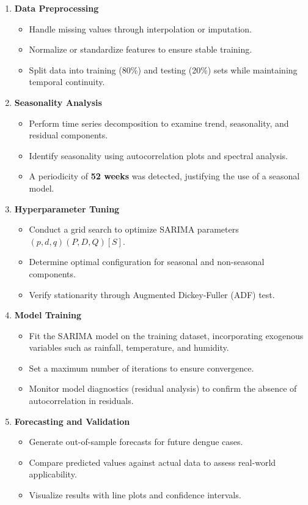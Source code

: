 \begin{enumerate}
	\item \textbf{Data Preprocessing}  
	\begin{itemize}
		\item Handle missing values through interpolation or imputation.
		\item Normalize or standardize features to ensure stable training.
		\item Split data into training (80\%) and testing (20\%) sets while maintaining temporal continuity.
	\end{itemize}
	
	\item \textbf{Seasonality Analysis}  
	\begin{itemize}
		\item Perform time series decomposition to examine trend, seasonality, and residual components.
		\item Identify seasonality using autocorrelation plots and spectral analysis.
		\item A periodicity of \textbf{52 weeks} was detected, justifying the use of a seasonal model.
	\end{itemize}
	
	\item \textbf{Hyperparameter Tuning}  
	\begin{itemize}
		\item Conduct a grid search to optimize SARIMA parameters $(p, d, q)(P, D, Q)[S]$.
		\item Determine optimal configuration for seasonal and non-seasonal components.
		\item Verify stationarity through Augmented Dickey-Fuller (ADF) test.
	\end{itemize}
	
	\item \textbf{Model Training}  
	\begin{itemize}
		\item Fit the SARIMA model on the training dataset, incorporating exogenous variables such as rainfall, temperature, and humidity.
		\item Set a maximum number of iterations to ensure convergence.
		\item Monitor model diagnostics (residual analysis) to confirm the absence of autocorrelation in residuals.
	\end{itemize}
	
	\item \textbf{Forecasting and Validation}  
	\begin{itemize}
		\item Generate out-of-sample forecasts for future dengue cases.
		\item Compare predicted values against actual data to assess real-world applicability.
		\item Visualize results with line plots and confidence intervals.
	\end{itemize}
	
\end{enumerate}

